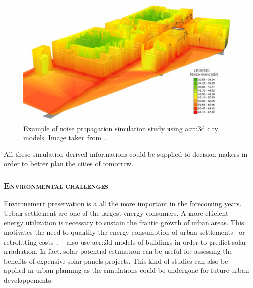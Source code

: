             \begin{figure}[htpb]
                \centering
                \includegraphics[width=\textwidth]{images/introduction/3d_model_applications/noise_simulation}
                \caption[
                    Example of noise propagation simulation study using \acrshort*{acr::3d} city models.
                ]{
                    \label{fig::noise_propogation}
                    Example of noise propagation simulation study using \gls{acr::3d} city models.
                    Image taken from~\parencite{kurakula2007gis}.
                }
            \end{figure}

            All these simulation derived informations could be supplied to decision makers in order to better plan the cities of tomorrow.

        \subsubsection{\textsc{Environmental challenges}}
            Environement preservation is a all the more important in the forecoming years.
            Urban settlement are one of the largest energy consumers.
            A more efficient energy utilization is necessary to sustain the frantic growth of urban areas.
            This motivates the need to quantify the energy consumption of urban settlements~\parencite{WATE20153372} or retrofitting costs~\parencite{previtali2014automatic}.
            ~\textcite{biljecki2015propagation} also use \gls{acr::3d} models of buildings in order to predict solar irradiation.
            In fact, solar potential estimation can be useful for assessing the benefits of expensive solar panels projects.
            This kind of studies can also be applied in urban planning as the simulations could be undergone for future urban developpements.

